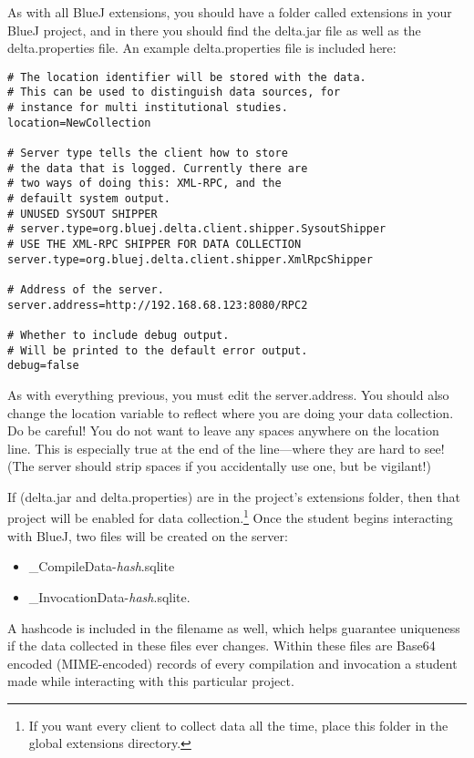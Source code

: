 \documentclass[12pt]{article}
\begin{document}
As with all BlueJ extensions, you should have a folder called {\code extensions} in your BlueJ project, and in there you should find the {\code delta.jar} file as well as the {\code delta.properties} file. An example {\code delta.properties} file is included here:

\begin{verbatim}
# The location identifier will be stored with the data. 
# This can be used to distinguish data sources, for 
# instance for multi institutional studies.
location=NewCollection

# Server type tells the client how to store 
# the data that is logged. Currently there are
# two ways of doing this: XML-RPC, and the
# defauilt system output.
# UNUSED SYSOUT SHIPPER
# server.type=org.bluej.delta.client.shipper.SysoutShipper
# USE THE XML-RPC SHIPPER FOR DATA COLLECTION
server.type=org.bluej.delta.client.shipper.XmlRpcShipper

# Address of the server.
server.address=http://192.168.68.123:8080/RPC2

# Whether to include debug output. 
# Will be printed to the default error output.
debug=false
\end{verbatim}

As with everything previous, you must edit the {\code server.address}. You should also change the {\code location} variable to reflect where you are doing your data collection. {\strong Do be careful!} You do not want to leave any spaces anywhere on the {\code location} line. This is especially true at the end of the line---where they are hard to see! (The server should strip spaces if you accidentally use one, but be vigilant!)

If ({\code delta.jar} and {\code delta.properties}) are in the project's {\code extensions} folder, then that project will be enabled for data collection.\footnote{If you want every client to collect data all the time, place this folder in the global extensions directory.} Once the student begins interacting with BlueJ, two files will be created on the server: 
\begin{itemize}
	\item {\_CompileData-{\em hash}.sqlite}
	\item {\_InvocationData-{\em hash}.sqlite}.
\end{itemize}	
A hashcode is included in the filename as well, which helps guarantee uniqueness if the data collected in these files ever changes.  Within these files are Base64 encoded (MIME-encoded) records of every compilation and invocation a student made while interacting with this particular project. 
\end{document}
